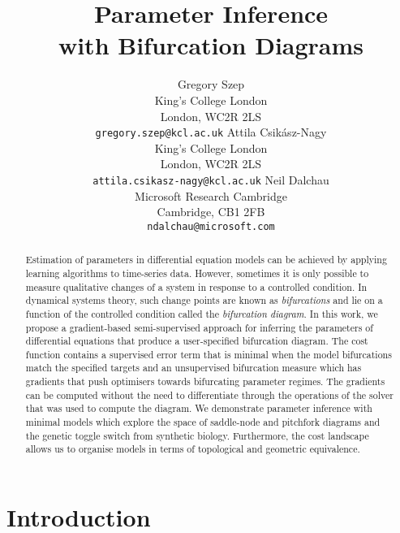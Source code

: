 

\title{Parameter Inference\\with Bifurcation Diagrams}
\author{
        Gregory Szep\\King's College London\\London, WC2R 2LS\\
        \texttt{gregory.szep@kcl.ac.uk}
    \And
        Attila Csik\'asz-Nagy\\King's College London\\London, WC2R 2LS\\
        \texttt{attila.csikasz-nagy@kcl.ac.uk}
    \And
        Neil Dalchau\\Microsoft Research Cambridge\\Cambridge, CB1 2FB\\
        \texttt{ndalchau@microsoft.com}
}



\maketitle
\begin{abstract}
    Estimation of parameters in differential equation models can be achieved by applying learning algorithms to time-series data. However, sometimes it is only possible to measure qualitative changes of a system in response to a controlled condition. In dynamical systems theory, such change points are known as \textit{bifurcations} and lie on a function of the controlled condition called the \textit{bifurcation diagram}. In this work, we propose a gradient-based semi-supervised approach for inferring the parameters of differential equations that produce a user-specified bifurcation diagram. The cost function contains a supervised error term that is minimal when the model bifurcations match the specified targets and an unsupervised bifurcation measure which has gradients that push optimisers towards bifurcating parameter regimes. The gradients can be computed without the need to differentiate through the operations of the solver that was used to compute the diagram. We demonstrate parameter inference with minimal models which explore the space of saddle-node and pitchfork diagrams and the genetic toggle switch from synthetic biology. Furthermore, the cost landscape allows us to organise models in terms of topological and geometric equivalence.
\end{abstract}


\section{Introduction}
\label{section:introduction}

